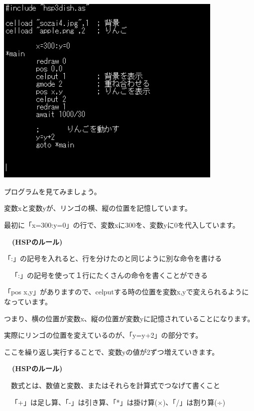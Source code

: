 \documentclass[a4paper,12pt]{jarticle}
\begin{document}
\bigskip
\bigskip

\begin{minipage}{9.781cm}
\centering
{\upshape
\includegraphics[keepaspectratio,width=10.954cm,height=9.213cm]{text04-img/text04-img020.png}}
\end{minipage}

\bigskip
\bigskip
\bigskip

プログラムを見てみましょう。

\bigskip

変数xと変数yが、リンゴの横、縦の位置を記憶しています。

最初に「x=300:y=0」の行で、変数xに300を、変数yに0を代入しています。


\bigskip

{\bfseries
\ \ (HSPのルール)

\bigskip

「:」の記号を入れると、行を分けたのと同じように別な命令を書ける

\ \ 「:」の記号を使って１行にたくさんの命令を書くことができる}


\bigskip

「pos x,y」がありますので、celputする時の位置を変数x,yで変えられるようになっています。

つまり、横の位置が変数x、縦の位置が変数yに記憶されていることになります。


\bigskip

実際にリンゴの位置を変えているのが、「y=y+2」の部分です。

ここを繰り返し実行することで、変数yの値が2ずつ増えていきます。


\bigskip

{\bfseries
\ \ (HSPのルール)

\bigskip

\ \ 数式とは、数値と変数、またはそれらを計算式でつなげて書くこと

\ \ 「+」は足し算、「-」は引き算、「*」は掛け算(×)、「/」は割り算(÷) }
\end{document}
